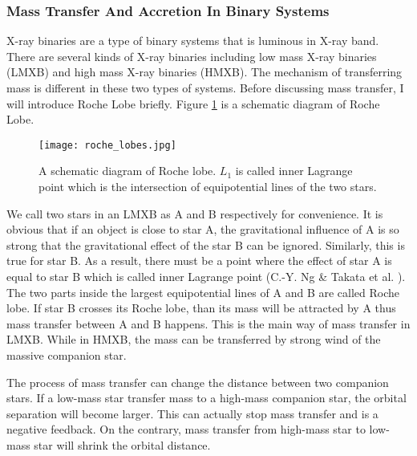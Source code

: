 \documentclass[12pt]{report}
\begin{document}
      \subsubsection{Mass Transfer And Accretion In Binary Systems}
        X-ray binaries are a type of binary systems that is luminous in X-ray band. 
        There are several kinds of X-ray binaries including low mass X-ray binaries 
        (LMXB) and high mass X-ray binaries (HMXB). The mechanism of transferring mass 
        is different in these two types of systems. Before discussing mass 
        transfer, I will introduce Roche Lobe briefly. Figure 
        \ref{fig:roche lobe} is a schematic diagram of Roche Lobe.
        \begin{figure}[!htp]
          \centering
          \texttt{[image: roche\_lobes.jpg]}
          \caption{A schematic diagram of Roche lobe. \protect $L_{1}$ is called inner 
                    Lagrange point which is the intersection of equipotential lines 
                    of the two stars.}
          \label{fig:roche lobe}
        \end{figure}
        We call two stars in an LMXB as A and B respectively for convenience. It is 
        obvious that if an object is close to star A, the gravitational influence of A 
        is so strong that the gravitational effect of the star B can be ignored. Similarly, 
        this is true for star B. As a result, there must be a point where the effect 
        of star A is equal to star B which is called inner Lagrange point 
        (C.-Y. Ng \& Takata et al. \cite{0004-637X-787-2-167}). The two parts inside the largest
        equipotential lines of A and B are called Roche lobe. If star B crosses
        its Roche lobe, than its mass will be attracted by A thus mass transfer between 
        A and B happens. This is the main way of mass transfer in 
        LMXB. While in HMXB, the mass can be transferred by strong wind of the massive 
        companion star. 

        The process of mass transfer can change the distance between two 
        companion stars. If a low-mass star transfer mass to a high-mass companion star,
        the orbital separation will become larger. This can actually stop mass transfer 
        and is a negative feedback. On the contrary, mass transfer from high-mass star 
        to low-mass star will shrink the orbital distance.
                       
\end{document}
